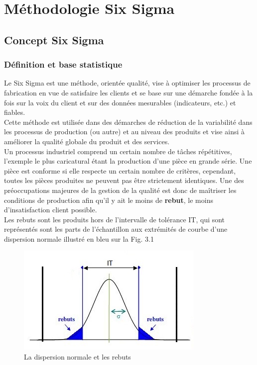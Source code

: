\documentclass[12pt, a4paper]{thesis}
\begin{document}
\vspace{-0.3cm}
\chapter{Méthodologie Six Sigma}
\section{Concept Six Sigma}
\subsection{Définition et base statistique}
Le Six Sigma est une méthode, orientée qualité, vise à optimiser les processus de fabrication en vue de satisfaire les clients et se base sur une démarche fondée à la fois sur la voix du client et sur des données mesurables (indicateurs, etc.) et fiables.\\
Cette méthode est utilisée dans des démarches de réduction de la variabilité dans les processus de production (ou autre) et au niveau des produits et vise ainsi à améliorer la qualité globale du produit et des services. \\
Un processus industriel comprend un certain nombre de tâches répétitives, l'exemple le plus caricatural étant la production d'une pièce en grande série. Une pièce est conforme si elle respecte un certain nombre de critères, cependant, toutes les pièces produites ne peuvent pas être strictement identiques. Une des préoccupations majeures de la gestion de la qualité est donc de maîtriser les conditions de production afin qu'il y ait le moins de \textbf{rebut}, le moins d'insatisfaction client possible. \\
Les rebuts sont les produits hors de l’intervalle de tolérance IT, qui sont représentés sont les parts de l’échantillon aux extrémités de courbe d’une dispersion normale illustré en bleu sur la Fig. 3.1
\begin{figure}[!h]
\begin{center}
        \includegraphics[scale=1]{IT.JPG}
       \caption{La dispersion normale et les rebuts}
\end{center}
\end{figure}
\end{document}

